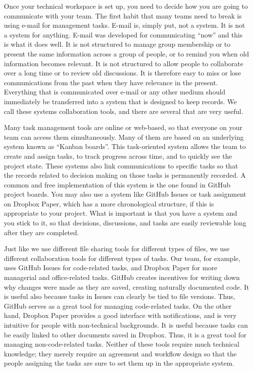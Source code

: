 Once your technical workspace is set up,
you need to decide how you are going to communicate with your team.
The first habit that many teams need to break is using e-mail for management tasks.
E-mail is, simply put, not a system. It is not a system for anything.
E-mail was developed for communicating ``now'' and this is what it does well.
It is not structured to manage group membership or to present the same information
across a group of people, or to remind you when old information becomes relevant.
It is not structured to allow people to collaborate over a long time or to review old discussions.
It is therefore easy to miss or lose communications from the past when they have relevance in the present.
Everything that is communicated over e-mail or any other medium should
immediately be transferred into a system that is designed to keep records.
We call these systems collaboration tools, and there are several that are very useful.

Many task management tools are online or web-based,
so that everyone on your team can access them simultaneously.
Many of them are based on an underlying system known as ``Kanban boards''.
This task-oriented system allows the team to create and assign tasks,
to track progress across time, and to quickly see the project state.
These systems also link communications to specific tasks so that
the records related to decision making on those tasks is permanently recorded.
A common and free implementation of this system is the one found in GitHub project boards.
You may also use a system like GitHub Issues or task assignment on Dropbox Paper,
which has a more chronological structure, if this is appropriate to your project.
What is important is that you have a system and you stick to it,
so that decisions, discussions, and tasks are easily reviewable long after they are completed.

Just like we use different file sharing tools for different types of files,
we use different collaboration tools for different types of tasks.
Our team, for example, uses GitHub Issues for code-related tasks,
and Dropbox Paper for more managerial and office-related tasks.
GitHub creates incentives for writing down why changes were made
as they are saved, creating naturally documented code.
It is useful also because tasks in Issues can clearly be tied to file versions.
Thus, GitHub serves as a great tool for managing code-related tasks.
On the other hand, Dropbox Paper provides a good interface with notifications,
and is very intuitive for people with non-technical backgrounds.
It is useful because tasks can be easily linked to other documents saved in Dropbox.
Thus, it is a great tool for managing non-code-related tasks.
Neither of these tools require much technical knowledge;
they merely require an agreement and workflow design
so that the people assigning the tasks are sure to set them up in the appropriate system.

